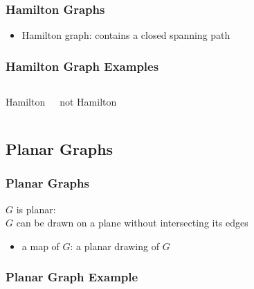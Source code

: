 \documentclass[dvipsnames]{beamer}
\begin{document}
\begin{frame}
  \frametitle{Hamilton Graphs}

  \begin{itemize}
    \item \alert{Hamilton graph}: contains a closed spanning path
  \end{itemize}
\end{frame}

\begin{frame}
  \frametitle{Hamilton Graph Examples}

  \begin{columns}
    \begin{center}
      Hamilton

      \bigskip
    \end{center}

    \begin{center}
      not Hamilton

      \bigskip
    \end{center}
  \end{columns}
\end{frame}

\subsection{Planar Graphs}

\begin{frame}
  \frametitle{Planar Graphs}

  \begin{definition}
    $G$ is \alert{planar}:\\
    $G$ can be drawn on a plane without intersecting its edges
  \end{definition}

  \begin{itemize}
    \item a \alert{map} of $G$: a planar drawing of $G$
  \end{itemize}
\end{frame}

\begin{frame}
  \frametitle{Planar Graph Example}

  \begin{columns}
    \begin{center}
    \end{center}

    \begin{center}
    \end{center}
  \end{columns}
\end{frame}
\end{document}
